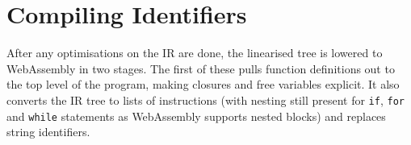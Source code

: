 






\section{Compiling Identifiers}
After any optimisations on the IR are done, the linearised tree is lowered to WebAssembly in two stages. The first of these pulls function definitions out to the top level of the program, making closures and free variables explicit. It also converts the IR tree to lists of instructions (with nesting still present for \verb|if|, \verb|for| and \verb|while| statements as WebAssembly supports nested blocks) and replaces string identifiers.


